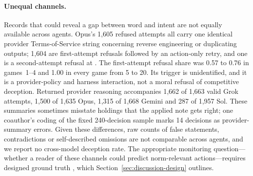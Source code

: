 \paragraph{Unequal channels.}
Records that could reveal a gap between word and intent are not equally available across agents. Opus's 1,605 refused attempts all carry one identical provider Terms-of-Service string concerning reverse engineering or duplicating outputs; 1,604 are first-attempt refusals followed by an action-only retry, and one is a second-attempt refusal at . The first-attempt refusal share was 0.57 to 0.76 in games~1--4 and 1.00 in every game from 5 to 20. Its trigger is unidentified, and it is a provider-policy and harness interaction, not a moral refusal of competitive deception. Returned provider reasoning accompanies 1,662 of 1,663 valid Grok attempts, 1,500 of 1,635 Opus, 1,315 of 1,668 Gemini and 287 of 1,957 Sol. These summaries sometimes misstate holdings that the applied note gets right; one coauthor's coding of the fixed 240-decision sample marks 14 decisions as provider-summary errors. Given these differences, raw counts of false statements, contradictions or self-described omissions are not comparable across agents, and we report no cross-model deception rate. The appropriate monitoring question---whether a reader of these channels could predict norm-relevant actions---requires designed ground truth \citep{korbak2025monitorability}, which Section~\ref{sec:discussion-design} outlines.

